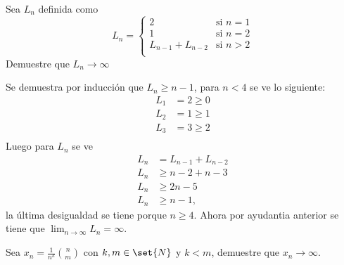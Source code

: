 \documentclass{ayudantia}
\begin{document}
\begin{prob}
    Sea \(L_n\) definida como
    \begin{equation*}
        L_n=\begin{cases}
            2               & \text{si }n=1 \\
            1               & \text{si }n=2 \\
            L_{n-1}+L_{n-2} & \text{si }n>2 \\
        \end{cases}
    \end{equation*}
    Demuestre que \(L_n\rightarrow\infty\)
\end{prob}

\begin{ans}
    \begin{sol}
        Se demuestra por inducción que \(L_n\geq n-1\), para \(n<4\) se ve lo siguiente:
        \begin{align*}
            L_1&=2\geq0\\
            L_2&=1\geq1\\
            L_3&=3\geq2\\
        \end{align*}
        Luego para \(L_n\) se ve
        \begin{align*}
            L_n&=L_{n-1}+L_{n-2}\\
            L_n&\geq n-2+n-3\\
            L_n&\geq 2n-5\\
            L_n&\geq n-1,
        \end{align*}
        la última desigualdad se tiene porque \(n\geq 4\). Ahora por ayudantia anterior se tiene que \(\lim_{n\rightarrow\infty}L_n=\infty\).
    \end{sol}
\end{ans}



\begin{prob}
    Sea \(x_n=\frac1{n^k}\binom{n}{m}\) con \(k,m\in\set{N}\) y \(k< m\), demuestre que \(x_n\rightarrow\infty\).
\end{prob}

\begin{ans}
    \begin{sol}

    \end{sol}
\end{ans}
\end{document}

